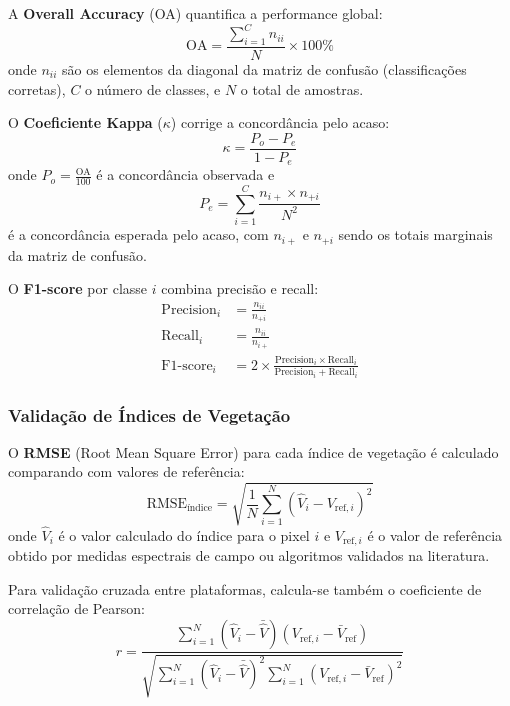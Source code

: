 A \textbf{Overall Accuracy} (OA) quantifica a performance global:
\begin{equation}
\text{OA} = \frac{\sum_{i=1}^{C} n_{ii}}{N} \times 100\%
\label{eq:overall_accuracy}
\end{equation}
onde $n_{ii}$ são os elementos da diagonal da matriz de confusão (classificações 
corretas), $C$ o número de classes, e $N$ o total de amostras.

O \textbf{Coeficiente Kappa} ($\kappa$) corrige a concordância pelo acaso:
\begin{equation}
\kappa = \frac{P_o - P_e}{1 - P_e}
\label{eq:kappa}
\end{equation}
onde $P_o = \frac{\text{OA}}{100}$ é a concordância observada e 
\begin{equation}
P_e = \sum_{i=1}^{C} \frac{n_{i+} \times n_{+i}}{N^2}
\label{eq:kappa_pe}
\end{equation}
é a concordância esperada pelo acaso, com $n_{i+}$ e $n_{+i}$ sendo os totais 
marginais da matriz de confusão.

O \textbf{F1-score} por classe $i$ combina precisão e recall:
\begin{align}
\text{Precision}_i &= \frac{n_{ii}}{n_{+i}} \label{eq:precision} \\
\text{Recall}_i &= \frac{n_{ii}}{n_{i+}} \label{eq:recall} \\
\text{F1-score}_i &= 2 \times \frac{\text{Precision}_i \times \text{Recall}_i}{\text{Precision}_i + \text{Recall}_i} \label{eq:f1score}
\end{align}

\subsubsection{Validação de Índices de Vegetação}

O \textbf{RMSE} (Root Mean Square Error) para cada índice de vegetação 
é calculado comparando com valores de referência:
\begin{equation}
\text{RMSE}_{\text{índice}} = \sqrt{\frac{1}{N} \sum_{i=1}^{N} (\hat{V}_i - V_{\text{ref},i})^2}
\label{eq:rmse_indices}
\end{equation}
onde $\hat{V}_i$ é o valor calculado do índice para o pixel $i$ e $V_{\text{ref},i}$ 
é o valor de referência obtido por medidas espectrais de campo ou algoritmos 
validados na literatura.

Para validação cruzada entre plataformas, calcula-se também o coeficiente 
de correlação de Pearson:
\begin{equation}
r = \frac{\sum_{i=1}^{N}(\hat{V}_i - \bar{\hat{V}})(V_{\text{ref},i} - \bar{V}_{\text{ref}})}{\sqrt{\sum_{i=1}^{N}(\hat{V}_i - \bar{\hat{V}})^2 \sum_{i=1}^{N}(V_{\text{ref},i} - \bar{V}_{\text{ref}})^2}}
\label{eq:correlation_indices}
\end{equation}

